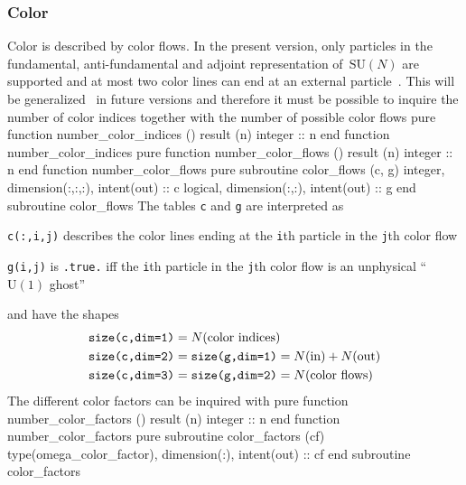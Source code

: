 \documentclass[12pt,a4paper]{article}
\newenvironment{files}%
 {\begin{list}{}%
   {\setlength{\leftmargin}{3em}%
    \setlength{\rightmargin}{3em}%
    \setlength{\itemindent}{1em}%
    \setlength{\listparindent}{0pt}%
    \settowidth{\labelwidth}{5em}%
    \renewcommand{\makelabel}[1]{\texttt{##1}}}}%
 {\end{list}}
\newenvironment{code}{\verbatim}{\endverbatim\noindent}
\begin{document}
\subsubsection{Color}
Color is described by color flows. In the present version, only
particles in the fundamental, anti-fundamental and adjoint
representation of~$\text{SU}(N)$ are supported and at
most two color lines can end at an external particle~\cite{OMEGA2}.
This will be generalized~\cite{cflow}
in future versions and therefore it must be
possible to inquire the number of color indices together with the
number of possible color flows
\begin{code}
  pure function number_color_indices () result (n)
    integer :: n
  end function number_color_indices
  pure function number_color_flows () result (n)
    integer :: n
  end function number_color_flows
  pure subroutine color_flows (c, g)
    integer, dimension(:,:,:), intent(out) :: c
    logical, dimension(:,:), intent(out) :: g
  end subroutine color_flows
\end{code}
The tables \verb+c+ and \verb+g+ are interpreted as
\begin{files}
  \item[\texttt{c(:,i,j)}] describes the color lines ending at the
    \verb+i+th particle in the \verb+j+th color flow
  \item[\texttt{g(i,j)}] is \verb+.true.+ iff the
    \verb+i+th particle in the \verb+j+th color flow is an unphysical
    ``$\text{U}(1)$ ghost''~\cite{OMEGA2}
\end{files}
and have the shapes
\begin{align*}
  \text{\texttt{size(c,dim=1)}} &= N(\text{color indices}) \\
  \text{\texttt{size(c,dim=2)}} &= \text{\texttt{size(g,dim=1)}} = N(\text{in}) + N(\text{out}) \\
  \text{\texttt{size(c,dim=3)}} &= \text{\texttt{size(g,dim=2)}} = N(\text{color flows})
\end{align*}
The different color factors can be inquired with
\begin{code}
  pure function number_color_factors () result (n)
    integer :: n
  end function number_color_factors
  pure subroutine color_factors (cf)
    type(omega_color_factor), dimension(:), intent(out) :: cf
  end subroutine color_factors
\end{code}

\end{document}
